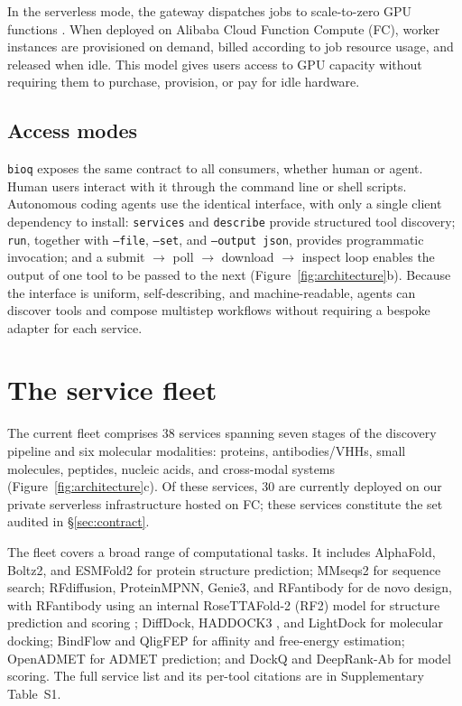 \documentclass[webpdf,contemporary,large,namedate]{oup-authoring-template}%
\begin{document}
In the serverless mode, the gateway dispatches jobs to scale-to-zero
GPU functions \citep{jonas_cloud_2019}. When deployed on Alibaba Cloud
Function Compute (FC), worker instances are provisioned on demand,
billed according to job resource usage, and released when idle. This
model gives users access to GPU capacity without requiring them to
purchase, provision, or pay for idle hardware.


\subsection{Access modes}\label{sec:accessmodes}

\texttt{bioq} exposes the same contract to all consumers, whether human or
agent. Human users interact with it through the command line or shell
scripts. Autonomous coding agents use the identical interface, with
only a single client dependency to install: \texttt{services} and
\texttt{describe} provide structured tool discovery; \texttt{run},
together with \texttt{--file}, \texttt{--set}, and \texttt{--output
  json}, provides programmatic invocation; and a submit $\rightarrow$
poll $\rightarrow$ download $\rightarrow$ inspect loop enables the
output of one tool to be passed to the next
(Figure~\ref{fig:architecture}b). Because the interface is uniform,
self-describing, and machine-readable, agents can discover tools and
compose multistep workflows without requiring a bespoke adapter for
each service.


\section{The service fleet}\label{sec:fleet}


The current fleet comprises 38 services spanning seven stages of the
discovery pipeline and six molecular modalities: proteins,
antibodies/VHHs, small molecules, peptides, nucleic acids, and
cross-modal systems (Figure~\ref{fig:architecture}c). Of these
services, 30 are currently deployed on our private serverless
infrastructure hosted on FC; these services constitute the set audited
in \S\ref{sec:contract}.

The fleet covers a broad range of computational tasks. It includes
AlphaFold, Boltz2, and ESMFold2 for protein structure prediction;
MMseqs2 \citep{steinegger_mmseqs2_2017} for sequence search;
RFdiffusion, ProteinMPNN, Genie3, and RFantibody for de novo design,
with RFantibody using an internal RoseTTAFold-2 (RF2) model for
structure prediction and scoring \citep{bennett_atomically_2026};
DiffDock, HADDOCK3 \citep{giulini_haddock3_2025}, and LightDock for
molecular docking; BindFlow and QligFEP for affinity and free-energy
estimation; OpenADMET \citep{fraser_mapping_2026} for ADMET
prediction; and DockQ \citep{basu_dockq_2016} and DeepRank-Ab
\citep{xu_deeprank-ab_2025} for model scoring. The full service list
and its per-tool citations are in Supplementary Table~S1.
\end{document}
